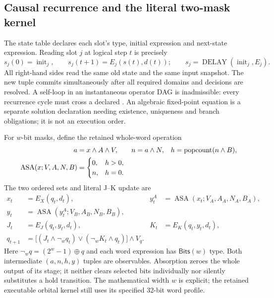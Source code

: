 \subsection{Causal recurrence and the literal two-mask kernel}
The state table declares each slot's type, initial expression and next-state
expression. Reading slot $j$ at logical step $t$ is precisely
\[
 s_j(0)=\operatorname{init}_j,\qquad
 s_j(t+1)=E_j(s(t),d(t));
 \qquad s_j=\operatorname{DELAY}(\operatorname{init}_j,E_j).
\]
All right-hand sides read the same old state and the same input snapshot. The
new tuple commits simultaneously after all required domains and decisions are
resolved. A self-loop in an instantaneous operator DAG is inadmissible: every
recurrence cycle must cross a declared . An algebraic fixed-point
equation is a separate solution declaration needing existence, uniqueness
and branch obligations; it is not an execution order.

For $w$-bit masks, define the retained whole-word operation
\begin{align*}
 a&=x\land A\land V,& n&=a\land N,& h&=\operatorname{popcount}(n\land B),\\
 \operatorname{ASA}(x;V,A,N,B)&=
 \begin{cases}0,&h>0,\\n,&h=0.\end{cases}
\end{align*}
The two ordered sets and literal J--K update are
\begin{align*}
 x_t&=E_X(q_t,d_t),&
 y_t^{A}&=\operatorname{ASA}(x_t;V_A,A_A,N_A,B_A),\\
 y_t&=\operatorname{ASA}(y_t^{A};V_B,A_B,N_B,B_B),\\
 J_t&=E_J(q_t,y_t,d_t),& K_t&=E_K(q_t,y_t,d_t),\\
 q_{t+1}&=\bigl[(J_t\land\neg_w q_t)
       \lor(\neg_w K_t\land q_t)\bigr]\land V_q.
\end{align*}
Here $\neg_w q=(2^w-1)\mathbin{\oplus}q$ and each word expression has
$\mathsf{Bits}(w)$ type. Both intermediate $(a,n,h,y)$ tuples are observables.
Absorption zeroes the whole output of its stage; it neither clears selected bits
individually nor silently substitutes a hold transition. The mathematical width
$w$ is explicit; the retained executable orbital kernel still uses its specified
32-bit word profile.

